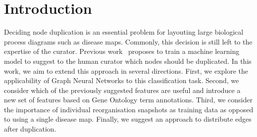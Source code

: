 \documentclass[
	fontsize=10pt, %
	twoside=true, %
	secnumdepth=1, %
  toc=indentunnumbered %
]{kaobook}
\begin{document}





\chapter{Introduction}








Deciding node duplication is an essential problem for layouting large biological
process diagrams such as disease maps. Commonly, this decision is still left to
the expertise of the curator. Previous work~\cite{nielsen_MachineLearningSupport_2019} proposes to train a machine learning
model to suggest to the human curator which nodes should be duplicated. In this
work, we aim to extend this approach in several directions. First, we explore
the applicability of Graph Neural Networks to this classification task. Second,
we consider which of the previously suggested features are useful and introduce
a new set of features based on Gene Ontology term annotations. Third, we
consider the importance of individual reorganisation snapshots as training data
as opposed to using a single disease map. Finally, we suggest an approach to
distribute edges after duplication.


\end{document}
